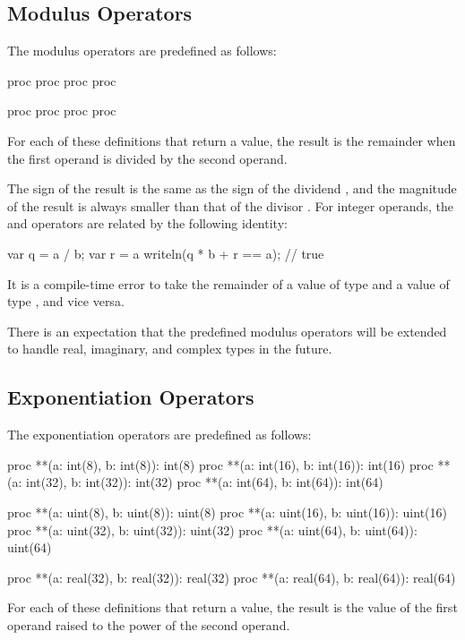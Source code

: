 \pagebreak
\subsection{Modulus Operators}
\label{Modulus_Operators}

The modulus operators are predefined as follows:
\begin{chapel}
proc %
proc %
proc %
proc %

proc %
proc %
proc %
proc %
\end{chapel}
For each of these definitions that return a value, the result is the
remainder when the first operand is divided by the second operand.

The sign of the result is the same as the sign of the dividend , and the
magnitude of the result is always smaller than that of the divisor .
For integer operands, the \chpl{\%} and \chpl{/} operators are related by the
following identity:
\begin{chapel}
var q = a / b;
var r = a %
writeln(q * b + r == a);    // true
\end{chapel}

It is a compile-time error to take the remainder of a value of
type  and a value of type , and vice
versa.

There is an expectation that the predefined modulus operators will be
extended to handle real, imaginary, and complex types in the future.

\subsection{Exponentiation Operators}
\label{Exponentiation_Operators}

The exponentiation operators are predefined as follows:
\begin{chapel}
proc **(a: int(8), b: int(8)): int(8)
proc **(a: int(16), b: int(16)): int(16)
proc **(a: int(32), b: int(32)): int(32)
proc **(a: int(64), b: int(64)): int(64)

proc **(a: uint(8), b: uint(8)): uint(8)
proc **(a: uint(16), b: uint(16)): uint(16)
proc **(a: uint(32), b: uint(32)): uint(32)
proc **(a: uint(64), b: uint(64)): uint(64)

proc **(a: real(32), b: real(32)): real(32)
proc **(a: real(64), b: real(64)): real(64)
\end{chapel}
For each of these definitions that return a value, the result is the
value of the first operand raised to the power of the second operand.

